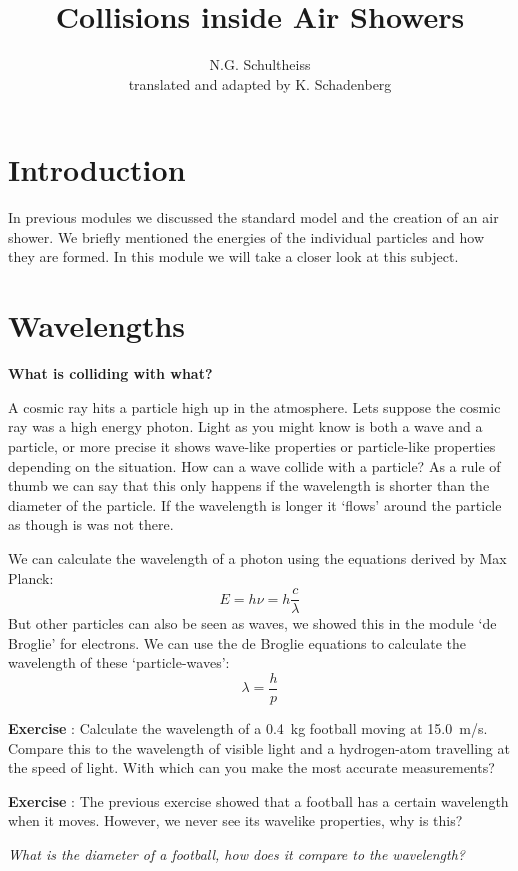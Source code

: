 \documentclass[12pt,a4paper]{article}
\author{N.G. Schultheiss \\ translated and adapted by K. Schadenberg}
\date{}
\title{Collisions inside Air Showers}
\numberwithin{equation}{section}
\numberwithin{figure}{section}
\newcounter{Exercise}
\numberwithin{table}{section}
\begin{document}
\maketitle

\section{Introduction}
In previous modules we discussed the standard model and the creation of an air shower. We briefly mentioned the energies of the individual particles and how they are formed. In this module we will take a closer look at this subject.

\section{Wavelengths}
\textbf{What is colliding with what?}

A cosmic ray hits a particle high up in the atmosphere. Lets suppose the cosmic ray was a high energy photon. Light as you might know is both a wave and a particle, or more precise it shows wave-like properties or particle-like properties depending on the situation. How can a wave collide with a particle? As a rule of thumb we can say that this only happens if the wavelength is shorter than the diameter of the particle. If the wavelength is longer it `flows' around the particle as though is was not there.

We can calculate the wavelength of a photon using the equations derived by Max Planck:
\begin{equation}
E=h \nu = h \frac{c}{\lambda}
\end{equation}
But other particles can also be seen as waves, we showed this in the module `de Broglie' for electrons. We can use the de Broglie equations to calculate the wavelength of these `particle-waves':
\begin{equation}
\lambda = \frac{h}{p} \label{eq:broglie}
\end{equation}

\begin{shaded}
\textbf{Exercise \theExercise {}} : Calculate the wavelength of a 0.4~kg football moving at 15.0~m/s. Compare this to the wavelength of visible light and a hydrogen-atom travelling at the speed of light. With which can you make the most accurate measurements?\end{shaded}

\begin{shaded}
\textbf{Exercise \theExercise {}} : The previous exercise showed that a football has a certain wavelength when it moves. However, we never see its wavelike properties, why is this?

\emph{What is the diameter of a football, how does it compare to the wavelength?} \end{shaded}
\end{document}
